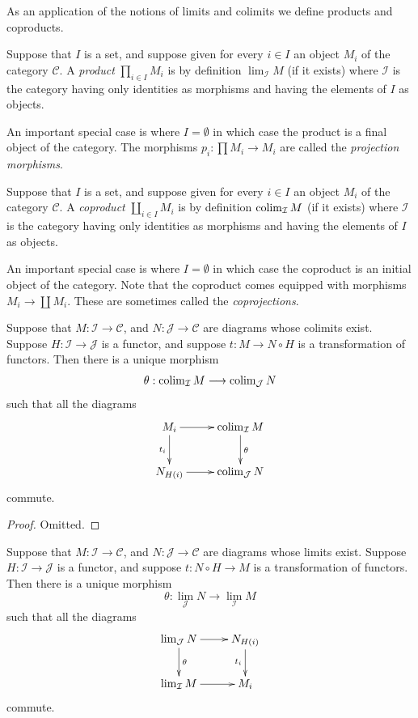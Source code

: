 \noindent
As an application of the notions of limits and colimits
we define products and coproducts.

\begin{definition}
\label{definition-product}
Suppose that $I$ is a set, and suppose given for every $i \in I$ an
object $M_i$ of the category $\mathcal{C}$. A {\it product}
$\prod_{i\in I} M_i$ is by definition $\lim_\mathcal{I} M$
(if it exists)
where $\mathcal{I}$ is the category having only identities as
morphisms and having the elements of $I$ as objects.
\end{definition}

\noindent
An important special case is where $I = \emptyset$ in which case the
product is a final object of the category.
The morphisms $p_i : \prod M_i \to M_i$ are called the
{\it projection morphisms}.

\begin{definition}
\label{definition-coproduct}
Suppose that $I$ is a set, and suppose given for every $i \in I$ an
object $M_i$ of the category $\mathcal{C}$. A {\it coproduct}
$\coprod_{i\in I} M_i$ is by definition $\mathop{\mathrm{colim}}\nolimits_\mathcal{I} M$
(if it exists) where $\mathcal{I}$ is the category having only
identities as morphisms and having the elements of $I$ as objects.
\end{definition}

\noindent
An important special case is where $I = \emptyset$ in which case the
coproduct is an initial object of the category.
Note that the coproduct comes equipped with morphisms
$M_i \to \coprod M_i$. These are sometimes called the
{\it coprojections}.

\begin{lemma}
\label{lemma-functorial-colimit}
Suppose that $M : \mathcal{I} \to \mathcal{C}$,
and $N : \mathcal{J} \to \mathcal{C}$ are diagrams
whose colimits exist. Suppose
$H : \mathcal{I} \to \mathcal{J}$ is
a functor, and suppose $t : M \to N \circ H$
is a transformation of functors.
Then there is a unique morphism
$$
\theta :
\mathop{\mathrm{colim}}\nolimits_\mathcal{I} M
\longrightarrow
\mathop{\mathrm{colim}}\nolimits_\mathcal{J} N
$$
such that all the diagrams
$$
\xymatrix{
M_i \ar[d]_{t_i} \ar[r]
&
\colim_\mathcal{I} M \ar[d]^{\theta}
\\
N_{H(i)} \ar[r]
&
\colim_\mathcal{J} N
}
$$
commute.
\end{lemma}

\begin{proof}
Omitted.
\end{proof}

\begin{lemma}
\label{lemma-functorial-limit}
Suppose that $M : \mathcal{I} \to \mathcal{C}$,
and $N : \mathcal{J} \to \mathcal{C}$ are diagrams
whose limits exist. Suppose $H : \mathcal{I} \to \mathcal{J}$ is
a functor, and suppose $t : N \circ H \to M$
is a transformation of functors.
Then there is a unique morphism
$$
\theta :
\lim_\mathcal{J} N
\longrightarrow
\lim_\mathcal{I} M
$$
such that all the diagrams
$$
\xymatrix{
\lim_\mathcal{J} N \ar[d]^{\theta} \ar[r]
&
N_{H(i)} \ar[d]_{t_i}
\\
\lim_\mathcal{I} M \ar[r]
&
M_i
}
$$
commute.
\end{lemma}

